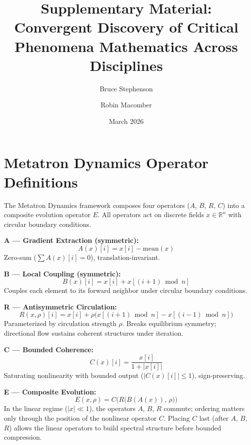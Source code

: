 \documentclass[11pt]{article}
\title{Supplementary Material:\\Convergent Discovery of Critical Phenomena Mathematics Across Disciplines}
\author{Bruce Stephenson \and Robin Macomber}
\date{March 2026}
\begin{document}
\maketitle

\section{Metatron Dynamics Operator Definitions}
\label{sec:operators}

The Metatron Dynamics framework composes four operators ($A$, $B$, $R$, $C$) into a composite evolution operator $E$. All operators act on discrete fields $x \in \mathbb{R}^n$ with circular boundary conditions.

\medskip
\noindent\textbf{A --- Gradient Extraction (symmetric):}
\begin{equation}
A(x)[i] = x[i] - \mathrm{mean}(x)
\end{equation}
Zero-sum ($\sum A(x)[i] = 0$), translation-invariant.

\medskip
\noindent\textbf{B --- Local Coupling (symmetric):}
\begin{equation}
B(x)[i] = x[i] + x[(i+1) \bmod n]
\end{equation}
Couples each element to its forward neighbor under circular boundary conditions.

\medskip
\noindent\textbf{R --- Antisymmetric Circulation:}
\begin{equation}
R(x, \rho)[i] = x[i] + \rho \bigl( x[(i{+}1) \bmod n] - x[(i{-}1) \bmod n] \bigr)
\end{equation}
Parameterized by circulation strength $\rho$. Breaks equilibrium symmetry; directional flow sustains coherent structures under iteration.

\medskip
\noindent\textbf{C --- Bounded Coherence:}
\begin{equation}
C(x)[i] = \frac{x[i]}{1 + |x[i]|}
\end{equation}
Saturating nonlinearity with bounded output ($|C(x)[i]| \leq 1$), sign-preserving.

\medskip
\noindent\textbf{E --- Composite Evolution:}
\begin{equation}
E(x, \rho) = C\bigl(R\bigl(B(A(x)),\, \rho\bigr)\bigr)
\end{equation}
In the linear regime ($|x| \ll 1$), the operators $A$, $B$, $R$ commute; ordering matters only through the position of the nonlinear operator $C$. Placing $C$ last (after $A$, $B$, $R$) allows the linear operators to build spectral structure before bounded compression.
\end{document}
